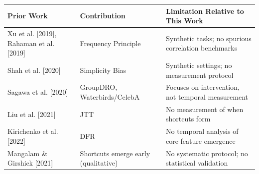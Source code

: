\begin{table}[htbp]
\centering
\begin{tabular}{lll}
\toprule
Prior Work & Contribution & Limitation Relative to This Work \\
\midrule
Xu et al. [2019], Rahaman et al. [2019] & Frequency Principle & Synthetic tasks; no spurious correlation benchmarks \\
Shah et al. [2020] & Simplicity Bias & Synthetic settings; no measurement protocol \\
Sagawa et al. [2020] & GroupDRO, Waterbirds/CelebA & Focuses on intervention, not temporal measurement \\
Liu et al. [2021] & JTT & No measurement of when shortcuts form \\
Kirichenko et al. [2022] & DFR & No temporal analysis of core feature emergence \\
Mangalam \& Girshick [2021] & Shortcuts emerge early (qualitative) & No systematic protocol; no statistical validation \\
\bottomrule
\end{tabular}
\end{table}

